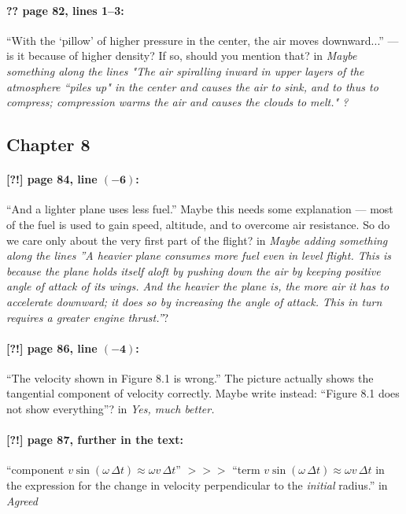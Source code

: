 \documentclass[twoside]{article}
\begin{document}
\paragraph{?? page 82, lines 1--3:} “With the ‘pillow’ of higher pressure in the center, the air moves downward...” — is it because of higher density? If so, should you mention that? 
 in
{\it  Maybe something along the lines "The air spiralling inward in upper layers of the atmosphere ``piles up" in the center and causes the air to sink, and to thus to compress; compression warms the air and causes the clouds to melt." ?}

\subsection*{Chapter 8}

\paragraph{[?!] page 84, line $\bm{(-6)}$:} “And a lighter plane uses less fuel.” Maybe this needs some explanation — most of the fuel is used to gain speed, altitude, and to overcome air resistance. So do we care only about the very first part of the flight?
 in {\it  Maybe adding something along the lines ''A heavier plane consumes more fuel even in level flight. This is because the plane holds itself aloft   by pushing down the air by keeping positive angle of attack of its wings. And the heavier the plane is, the more air it has to accelerate downward; it does so by increasing the angle of attack. This in turn requires a greater engine thrust.''}?

\paragraph{[?!] page 86, line $\bm{(-4)}$:}
“The velocity shown in Figure 8.1 is wrong.” The picture actually shows the tangential component of velocity correctly. Maybe write instead: “Figure 8.1 does not show everything”?
 in {\it  Yes, much better. } 

\paragraph{[?!] page 87, further in the text:} “component $v \sin(\omega \,\Delta t) \approx \omega v \,\Delta t$” $>\!>\!>$ “term $v \sin(\omega \,\Delta t) \approx \omega v \,\Delta t$ in the expression for the change in velocity perpendicular to the \emph{initial} radius.”
 in {\it  Agreed} 
\end{document}
